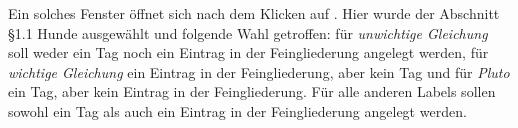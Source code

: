 \documentclass[parskip=off,index=totocnumbered]{scrartcl}
\newenvironment{rückkeinstück2}
	{\begin{adjustwidth}{0cm}{0cm}\footnotesize \singlespace} 
	{\end{adjustwidth} \onehalfspacing}
\begin{document}
\noindent \begin{minipage}{\textwidth}
\end{minipage}
              
\begin{rückkeinstück2}
    \noindent Ein solches Fenster öffnet sich nach dem Klicken auf . Hier wurde der Abschnitt \textsf{\S 1.1 Hunde} ausgewählt und folgende Wahl getroffen: für \textit{unwichtige Gleichung} soll weder ein Tag noch ein Eintrag in der Feingliederung angelegt werden, für \textit{wichtige Gleichung} ein Eintrag in der Feingliederung, aber kein Tag und für \textit{Pluto} ein Tag, aber kein Eintrag in der Feingliederung. Für alle anderen Labels sollen sowohl ein Tag als auch ein Eintrag in der Feingliederung angelegt werden.
    \vspace{0.6cm}
\end{rückkeinstück2}

\end{document}

